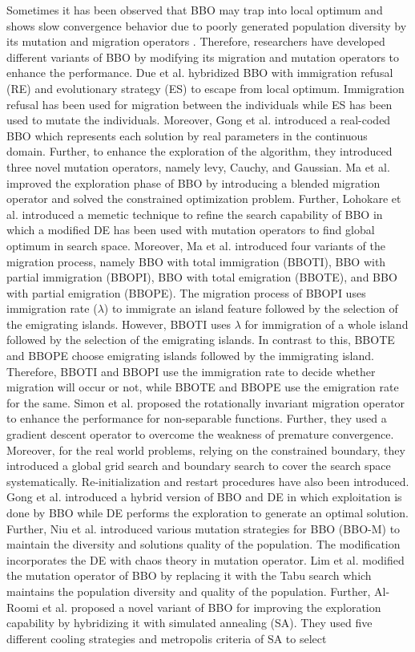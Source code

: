 Sometimes it has been observed that BBO may trap into local optimum and shows slow convergence behavior due to poorly generated population diversity by its mutation and migration operators \cite{pal2017a}. Therefore, researchers have developed different variants of BBO by modifying its migration and mutation operators to enhance the performance. Due et al. \cite{du2009} hybridized BBO with immigration refusal (RE) and evolutionary strategy (ES) to escape from local optimum. Immigration refusal has been used for migration between the individuals while ES has been used to mutate the individuals. Moreover, Gong et al. \cite{gong2010} introduced a real-coded BBO which represents each solution by real parameters in the continuous domain. Further,  to enhance the exploration of the algorithm, they introduced three novel mutation operators, namely levy, Cauchy, and Gaussian. Ma et al. \cite{ma2011}  improved the exploration phase of BBO by introducing a blended migration operator and solved the constrained optimization problem. Further, Lohokare et al. \cite{lohokare2013} introduced a memetic technique to refine the search capability of BBO in which a modified DE has been used with mutation operators to find global optimum in search space.  Moreover, Ma et al. \cite{ma2013} introduced four variants of the migration process, namely BBO with total immigration (BBOTI), BBO with partial immigration (BBOPI), BBO with total emigration (BBOTE), and BBO with partial emigration (BBOPE). The migration process of BBOPI uses immigration rate ($\lambda$) to immigrate an island feature followed by the selection of the emigrating islands. However, BBOTI uses $\lambda$ for immigration of a whole island followed by the selection of the emigrating islands. In contrast to this, BBOTE and BBOPE choose emigrating islands followed by the immigrating island. Therefore, BBOTI and BBOPI use the immigration rate to decide whether migration will occur or not, while BBOTE and BBOPE use the emigration rate for the same. Simon et al. \cite{simon2014} proposed the rotationally invariant migration operator to enhance the performance for non-separable functions. Further, they used a gradient descent operator to overcome the weakness of premature convergence. Moreover, for the real world problems, relying on the constrained boundary, they introduced a global grid search and boundary search to cover the search space systematically. Re-initialization and restart procedures have also been introduced. Gong et al. \cite{gong2010BBO} introduced a hybrid version of BBO and DE in which exploitation is done by BBO while DE performs the exploration to generate an optimal solution. Further, Niu et al. \cite{Niu2014} introduced various mutation strategies for BBO (BBO-M) to maintain the diversity and solutions quality of the population. The modification incorporates the DE with chaos theory in mutation operator. Lim et al. \cite{lim2016} modified the mutation operator of BBO by replacing it with the Tabu search which maintains the population diversity and quality of the population. Further, Al-Roomi et al. \cite{al2016} proposed a novel variant of BBO for improving the exploration capability by hybridizing it with simulated annealing (SA). They used five different cooling strategies and metropolis criteria of SA to select 